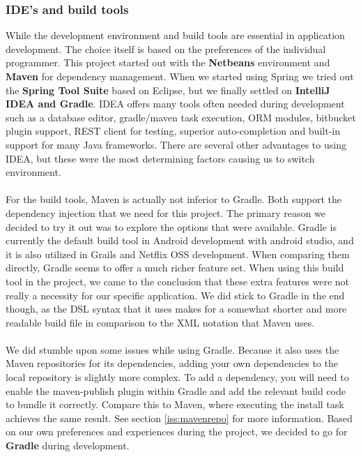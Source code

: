 \documentclass[12pt]{article}
\begin{document}
\begin{multicols}{2}
\subsubsection{IDE's and build tools}\label{sec:idebuild}
While the development environment and build tools are essential in application development. The choice itself is based on the preferences of the individual programmer. This project started out with the \textbf{Netbeans} environment and \textbf{Maven} for dependency management. When we started using Spring we tried out the \textbf{Spring Tool Suite} based on Eclipse, but we finally settled on \textbf{IntelliJ IDEA and Gradle}. IDEA offers many tools often needed during development such as a database editor, gradle/maven task execution, ORM modules, bitbucket plugin support, REST client for testing, superior auto-completion and built-in support for many Java frameworks. There are several other advantages to using IDEA, but these were the most determining factors causing us to switch environment. 
\\\\
For the build tools, Maven is actually not inferior to Gradle. Both support the dependency injection that we need for this project. The primary reason we decided to try it out was to explore the options that were available. Gradle is currently the default build tool in Android development with android studio, and it is also utilized in Grails and Netflix OSS development. When comparing them directly, Gradle seems to offer a much richer feature set. \cite{GradleVsMaven48:online} When using this build tool in the project, we came to the conclusion that these extra features were not really a necessity for our specific application. We did stick to Gradle in the end though, as the DSL syntax that it uses makes for a somewhat shorter and more readable build file in comparison to the XML notation that Maven uses. 
\\\\
We did stumble upon some issues while using Gradle. Because it also uses the Maven repositories for its dependencies, adding your own dependencies to the local repository is slightly more complex. To add a dependency, you will need to enable the maven-publish plugin within Gradle and add the relevant build code to bundle it correctly. Compare this to Maven, where executing the install task achieves the same result. See section \ref{iss:mavenrepo} for more information. Based on our own preferences and experiences during the project, we decided to go for \textbf{Gradle} during development.

\end{multicols}
\end{document}
